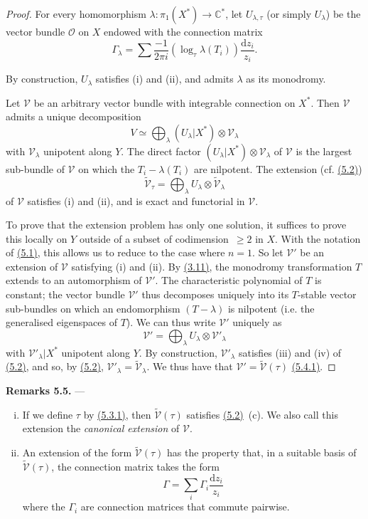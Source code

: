 \documentclass{report}
\newenvironment{rmenv}[1]
  {\phantomsection\par\medskip\noindent\textbf{#1.}\rmfamily}
  {\par\medskip}
\renewcommand{\cal}[1]{{\mathcal{#1}}}
\newcommand{\CC}{\mathbb{C}}
\newcommand{\dd}{\mathrm{d}}
\renewcommand{\geq}{\geqslant}
\newcommand{\oldpage}[1]{\marginpar{\footnotesize$\Big\vert$ \textit{p.~#1}}}
\begin{document}
\begin{proof}
  For every homomorphism $\lambda\colon\pi_1(X^*)\to\CC^*$, let $U_{\lambda,\tau}$ (or simply $U_\lambda$) be the vector bundle $\cal{O}$ on $X$ endowed with the connection matrix
  \[
    \Gamma_\lambda = \sum\frac{-1}{2\pi i}(\log_\tau\lambda(T_i))\frac{\dd z_i}{z_i}.
  \]

  By construction, $U_\lambda$ satisfies (i) and (ii), and admits $\lambda$ as its monodromy.

  Let $\cal{V}$ be an arbitrary vector bundle with integrable connection on $X^*$.
  Then $\cal{V}$ admits a unique decomposition
  \[
    V \simeq \bigoplus_\lambda (U_\lambda|X^*)\otimes\cal{V}_\lambda
  \]
  with $\cal{V}_\lambda$ unipotent along $Y$.
  The direct factor $(U_\lambda|X^*)\otimes\cal{V}_\lambda$ of $\cal{V}$ is the largest sub-bundle of $\cal{V}$ on which the $T_i-\lambda(T_i)$ are nilpotent.
  The extension (cf. \hyperref[II.5.2]{(5.2)})
  \[
  \label{II.5.4.1}
    \widetilde{\cal{V}}_\tau = \bigoplus_\lambda U_\lambda\otimes\widetilde{\cal{V}}_\lambda
  \tag{5.4.1}
  \]
  of $\cal{V}$ satisfies (i) and (ii), and is exact and functorial in $\cal{V}$.

  To prove that the extension problem has only one solution, it suffices to prove this locally on $Y$ outside of a subset of codimension~$\geq2$ in $X$.
  With the notation of \hyperref[II.5.1]{(5.1)}, this allows us to reduce to the case where $n=1$.
  So let $\cal{V}'$ be an extension of $\cal{V}$ satisfying (i) and (ii).
  By \hyperref[II.3.11]{(3.11)}, the monodromy transformation $T$ extends to an automorphism of $\cal{V}'$.
  The characteristic polynomial of $T$ is constant;
  the vector bundle $\cal{V}'$ thus decomposes uniquely into its $T$-stable vector sub-bundles on which an endomorphism $(T-\lambda)$ is nilpotent (i.e. the generalised eigenspaces of $T$).
  We can thus write $\cal{V}'$ uniquely as
  \[
    \cal{V}' = \bigoplus_\lambda U_\lambda\otimes\cal{V}'_\lambda
  \]
  with $\cal{V}'_\lambda|X^*$ unipotent along $Y$.
  By construction, $\cal{V}'_\lambda$ satisfies (iii) and (iv) of \hyperref[II.5.2]{(5.2)}, and so, by \hyperref[II.5.2]{(5.2)}, $\cal{V}'_\lambda=\widetilde{\cal{V}}_\lambda$.
  We thus have that $\cal{V}'=\widetilde{\cal{V}}(\tau)$ \hyperref[II.5.4.1]{(5.4.1)}.
\end{proof}

\begin{rmenv}{Remarks 5.5}
\label{II.5.5}
---
\begin{enumerate}[(i)]
  \item If we define $\tau$ by \hyperref[II.5.3.1]{(5.3.1)}, then $\widetilde{\cal{V}}(\tau)$ satisfies \hyperref[II.5.2]{(5.2)}~(c).
    We also call this extension the \emph{canonical extension} of $\cal{V}$.
\oldpage{96}
  \item An extension of the form $\widetilde{\cal{V}}(\tau)$ has the property that, in a suitable basis of $\widetilde{\cal{V}}(\tau)$, the connection matrix takes the form
    \[
      \Gamma = \sum_i\Gamma_i\frac{\dd z_i}{z_i}
    \]
    where the $\Gamma_i$ are connection matrices that commute pairwise.
\end{enumerate}
\end{rmenv}
\end{document}
